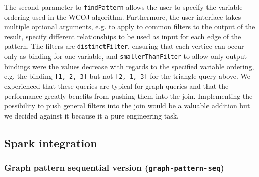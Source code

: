 The second parameter to \texttt{findPattern} allows the user to specify the variable ordering used in the WCOJ algorithm.
Furthermore, the user interface takes multiple optional arguments, e.g. to apply to common filters to the output of the result,
specify different relationships to be used as input for each edge of the pattern.
The filters are \texttt{distinctFilter}, ensuring that each vertice can occur only as binding for one variable, and
\texttt{smallerThanFilter} to allow only output bindings were the values decrease with regards to the specified variable ordering,
e.g. the binding \texttt{[1, 2, 3]} but not \texttt{[2, 1, 3]} for the triangle query above.
We experienced that these queries are typical for graph queries and that the performance greatly benefits from pushing
them into the join.
Implementing the possibility to push general filters into the join would be a valuable addition but we decided against it because
it a pure engineering task.


\subsection{Spark integration}\label{subsec:spark-integration}




\subsubsection{Graph pattern sequential version (\texttt{graph-pattern-seq})}
